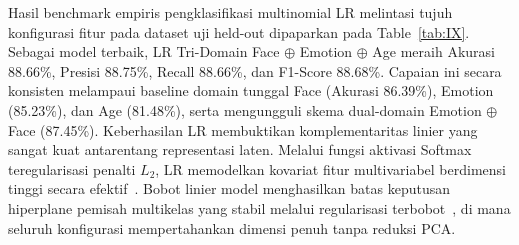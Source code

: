 Hasil benchmark empiris pengklasifikasi multinomial LR melintasi tujuh konfigurasi fitur pada dataset uji held-out dipaparkan pada Table~\ref{tab:IX}. Sebagai model terbaik, LR Tri-Domain Face $\oplus$ Emotion $\oplus$ Age meraih Akurasi 88.66\%, Presisi 88.75\%, Recall 88.66\%, dan F1-Score 88.68\%. Capaian ini secara konsisten melampaui baseline domain tunggal Face (Akurasi 86.39\%), Emotion (85.23\%), dan Age (81.48\%), serta mengungguli skema dual-domain Emotion $\oplus$ Face (87.45\%). Keberhasilan LR membuktikan komplementaritas linier yang sangat kuat antarentang representasi laten. Melalui fungsi aktivasi Softmax teregularisasi penalti $L_2$, LR memodelkan kovariat fitur multivariabel berdimensi tinggi secara efektif~\cite{ref49}. Bobot linier model menghasilkan batas keputusan hiperplane pemisah multikelas yang stabil melalui regularisasi terbobot~\cite{ref50}, di mana seluruh konfigurasi mempertahankan dimensi penuh tanpa reduksi PCA.

